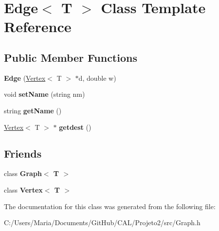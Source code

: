 \hypertarget{class_edge}{}\section{Edge$<$ T $>$ Class Template Reference}
\label{class_edge}
\subsection*{Public Member Functions}
\begin{DoxyCompactItemize}
\item 
\hypertarget{class_edge_a9da861a03f920c89984be33515a5d870}{}\label{class_edge_a9da861a03f920c89984be33515a5d870} 
{\bfseries Edge} (\hyperlink{class_vertex}{Vertex}$<$ T $>$ $\ast$d, double w)
\item 
\hypertarget{class_edge_a26a865cb6d37ed6f638dbe44cfe87253}{}\label{class_edge_a26a865cb6d37ed6f638dbe44cfe87253} 
void {\bfseries set\+Name} (string nm)
\item 
\hypertarget{class_edge_ac22363f7ccabc4948ee9f4dbdd13557b}{}\label{class_edge_ac22363f7ccabc4948ee9f4dbdd13557b} 
string {\bfseries get\+Name} ()
\item 
\hypertarget{class_edge_afa05210b87db69931486907be072c23a}{}\label{class_edge_afa05210b87db69931486907be072c23a} 
\hyperlink{class_vertex}{Vertex}$<$ T $>$ $\ast$ {\bfseries getdest} ()
\end{DoxyCompactItemize}
\subsection*{Friends}
\begin{DoxyCompactItemize}
\item 
\hypertarget{class_edge_aefa9b76cd57411c5354e5620dc2d84dd}{}\label{class_edge_aefa9b76cd57411c5354e5620dc2d84dd} 
class {\bfseries Graph$<$ T $>$}
\item 
\hypertarget{class_edge_a2e120a12dec663fa334633b4f26cbed8}{}\label{class_edge_a2e120a12dec663fa334633b4f26cbed8} 
class {\bfseries Vertex$<$ T $>$}
\end{DoxyCompactItemize}


The documentation for this class was generated from the following file\+:\begin{DoxyCompactItemize}
\item 
C\+:/\+Users/\+Maria/\+Documents/\+Git\+Hub/\+C\+A\+L/\+Projeto2/src/Graph.\+h\end{DoxyCompactItemize}

